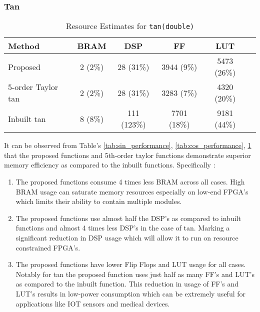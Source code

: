 \documentclass[12pt,twoside, letterpaper, margin=1in]{article}
\begin{document}
\subsubsection{Tan}
\begin{table}[H]
  \centering
  \caption{Resource Estimates for \texttt{tan(double)}}
  \small
  \begin{tabular}{lccccc}
    \toprule
    Method               & BRAM       & DSP           & FF           & LUT         \\
    \midrule
    Proposed             & 2 (2\%)    & 28 (31\%)     & 3944 (9\%)   & 5473 (26\%)   \\
    5-order Taylor tan   & 2 (2\%)    & 28 (31\%)     & 3283 (7\%)   & 4320 (20\%)   \\
    Inbuilt tan          & 8 (8\%)    & 111 (123\%)   & 7701 (18\%)  & 9181 (44\%)   \\
    \bottomrule
  \end{tabular}
  \label{tab:tan_performance}
\end{table}


It can be observed from Table's \ref{tab:sin_performance}, \ref{tab:cos_performance}, \ref{tab:tan_performance} that the proposed functions and  5th-order taylor functions demonstrate superior memory efficiency as compared to the inbuilt functions. Specifically :
\begin{enumerate}[label = \roman*]
    \item The proposed functions consume 4 times less BRAM across all cases. High BRAM usage can saturate memory resources especially on low-end FPGA's which limits their ability to contain multiple modules.
    \item The proposed functions use almost half the DSP's as compared to inbuilt functions and almost 4 times less DSP's in the case of tan. Marking a significant reduction in DSP usage which will allow it to run on resource constrained FPGA's.
    \item The proposed functions have lower Flip Flops and LUT usage for all cases. Notably for tan the proposed function uses just half as many FF's and LUT's as compared to the inbuilt function. This reduction in usage of FF's and LUT's results in low-power consumption which can be extremely useful for applications like IOT sensors and medical devices.  
\end{enumerate}
\end{document}
